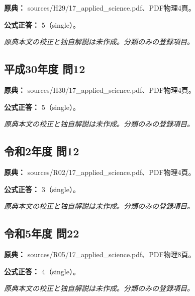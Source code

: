 \noindent\textbf{原典：} sources/H29/17\_applied\_science.pdf、PDF物理4頁。

\textbf{公式正答：} 5（single）。

\par\textit{原典本文の校正と独自解説は未作成。分類のみの登録項目。}

\subsection{平成30年度 問12}
\label{q:h30-reg-applied-12}

\noindent\textbf{原典：} sources/H30/17\_applied\_science.pdf、PDF物理4頁。

\textbf{公式正答：} 5（single）。

\par\textit{原典本文の校正と独自解説は未作成。分類のみの登録項目。}

\subsection{令和2年度 問12}
\label{q:r02-reg-applied-12}

\noindent\textbf{原典：} sources/R02/17\_applied\_science.pdf、PDF物理4頁。

\textbf{公式正答：} 3（single）。

\par\textit{原典本文の校正と独自解説は未作成。分類のみの登録項目。}

\subsection{令和5年度 問22}
\label{q:r05-reg-applied-22}

\noindent\textbf{原典：} sources/R05/17\_applied\_science.pdf、PDF物理8頁。

\textbf{公式正答：} 4（single）。

\par\textit{原典本文の校正と独自解説は未作成。分類のみの登録項目。}
